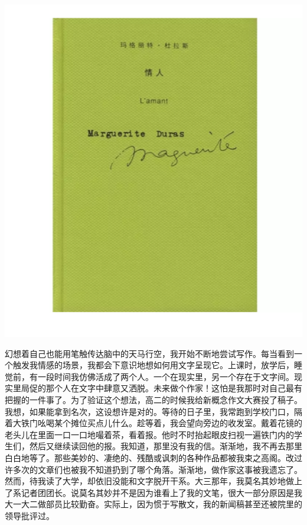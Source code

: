 \documentclass[]{book}
\begin{document}
\includegraphics[width=7.49in]{images/dream1}

幻想着自己也能用笔触传达脑中的天马行空，我开始不断地尝试写作。每当看到一个触发我情感的场景，我都会下意识地想如何用文字呈现它。上课时，放学后，睡觉前，有一段时间我仿佛活成了两个人。一个在现实里，另一个存在于文字间。现实里局促的那个人在文字中肆意又洒脱。未来做个作家！这怕是我那时对自己最有把握的一件事了。为了验证这个想法，高二的时候我给新概念作文大赛投了稿子。我想，如果能拿到名次，这设想许是对的。等待的日子里，我常跑到学校门口，隔着大铁门吆喝某个摊位买点儿什么。趁等着，我会望向旁边的收发室。戴着花镜的老头儿在里面一口一口地嘬着茶，看着报。他时不时抬起眼皮扫视一遍铁门内的学生们，然后又继续读回他的报。我知道，那里没有我的信。渐渐地，我不再去那里白白地等了。那些美妙的、凄绝的、残酷或讽刺的各种作品都被我束之高阁。改过许多次的文章们也被我不知道扔到了哪个角落。渐渐地，做作家这事被我遗忘了。然而，待我读了大学，却依旧没能和文字脱开干系。大三那年，我莫名其妙地做上了系记者团团长。说莫名其妙并不是因为谁看上了我的文笔，很大一部分原因是我大一大二做部员比较勤奋。实际上，因为惯于写散文，我的新闻稿甚至还被院里的领导批评过。
\end{document}
